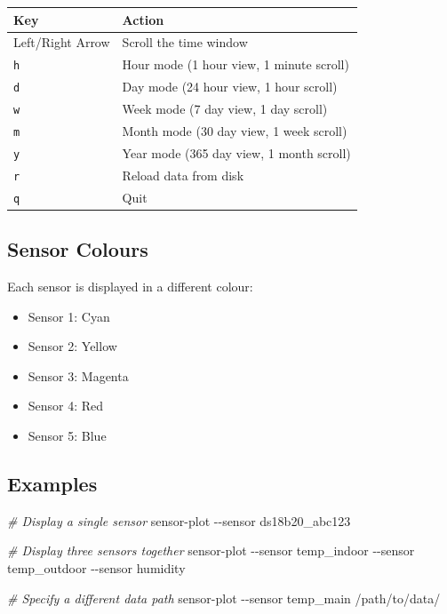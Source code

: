 \documentclass[
]{book}
\newenvironment{Shaded}{\begin{snugshade}}{\end{snugshade}}
\newcommand{\AttributeTok}[1]{\textcolor[rgb]{0.13,0.29,0.53}{#1}}
\newcommand{\CommentTok}[1]{\textcolor[rgb]{0.56,0.35,0.01}{\textit{#1}}}
\newcommand{\ExtensionTok}[1]{#1}
\newcommand{\NormalTok}[1]{#1}
\providecommand{\tightlist}{%
  \setlength{\itemsep}{0pt}\setlength{\parskip}{0pt}}
\begin{document}
{\def\LTcaptype{} %
\begin{longtable}[]{@{}ll@{}}
\toprule\noalign{}
Key & Action \\
\midrule\noalign{}
\endhead
\bottomrule\noalign{}
\endlastfoot
Left/Right Arrow & Scroll the time window \\
\texttt{h} & Hour mode (1 hour view, 1 minute scroll) \\
\texttt{d} & Day mode (24 hour view, 1 hour scroll) \\
\texttt{w} & Week mode (7 day view, 1 day scroll) \\
\texttt{m} & Month mode (30 day view, 1 week scroll) \\
\texttt{y} & Year mode (365 day view, 1 month scroll) \\
\texttt{r} & Reload data from disk \\
\texttt{q} & Quit \\
\end{longtable}
}

\subsection{Sensor Colours}\label{sensor-colours}

Each sensor is displayed in a different colour:

\begin{itemize}
\tightlist
\item
  Sensor 1: Cyan
\item
  Sensor 2: Yellow
\item
  Sensor 3: Magenta
\item
  Sensor 4: Red
\item
  Sensor 5: Blue
\end{itemize}

\subsection{Examples}\label{examples}

\begin{Shaded}
\begin{Highlighting}[]
\CommentTok{\# Display a single sensor}
\ExtensionTok{sensor{-}plot} \AttributeTok{{-}{-}sensor}\NormalTok{ ds18b20\_abc123}

\CommentTok{\# Display three sensors together}
\ExtensionTok{sensor{-}plot} \AttributeTok{{-}{-}sensor}\NormalTok{ temp\_indoor }\AttributeTok{{-}{-}sensor}\NormalTok{ temp\_outdoor }\AttributeTok{{-}{-}sensor}\NormalTok{ humidity}

\CommentTok{\# Specify a different data path}
\ExtensionTok{sensor{-}plot} \AttributeTok{{-}{-}sensor}\NormalTok{ temp\_main /path/to/data/}
\end{Highlighting}
\end{Shaded}
\end{document}
